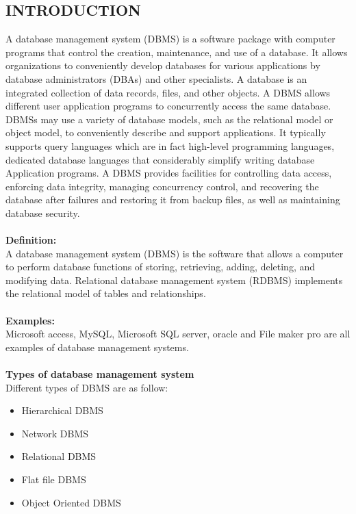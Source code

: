\documentclass[14pt]{article} %
\begin{document}
\subsection{INTRODUCTION}
A database management system (DBMS) is a software package with computer programs that control the creation, maintenance, and use of a database. It allows organizations to conveniently develop databases for various applications by database administrators (DBAs) and other specialists. A database is an integrated collection of data records, files, and other objects. A DBMS allows different user application programs to concurrently access the same database. DBMSs may use a variety of database models, such as the relational model or object model, to conveniently describe and support applications. It typically supports query languages which are in fact high-level programming languages, dedicated database languages that considerably simplify writing database Application programs.  A DBMS provides facilities for controlling data access, enforcing data integrity, managing concurrency control, and recovering the database after failures and restoring it from backup files, as well as maintaining database security.
\\
\\ \textbf{Definition:}
\\A database management system (DBMS) is the software that allows a computer to perform database functions of storing, retrieving, adding, deleting, and modifying data. Relational database management system (RDBMS) implements the relational model of tables and relationships.
\\
\\ \textbf{Examples:}
\\Microsoft access, MySQL, Microsoft SQL server, oracle and File maker pro are all examples of database management systems.
\\
\\ \textbf{Types of database management system}
  \\Different types of DBMS are as follow:
 \begin{itemize}
\item	Hierarchical DBMS  
\item	Network DBMS
\item	Relational DBMS
\item	Flat file DBMS
\item	 Object Oriented DBMS        
\end{itemize}
\end{document}
